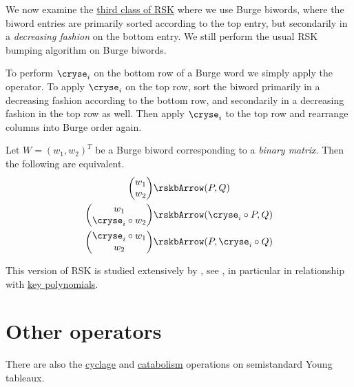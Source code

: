 \bigskip

We now examine the \hyperref[rskBurge]{third class of RSK} where we use Burge biwords,
where the biword entries are primarily sorted according to the top entry,
but secondarily in a \emph{decreasing fashion} on the bottom entry.
We still perform the usual RSK bumping algorithm on Burge biwords.

To perform $\cryse_i$ on the bottom row of a Burge word we simply apply the operator.
To apply $\cryse_i$ on the top row, sort the biword primarily in a decreasing fashion
according to the bottom row, and secondarily in a decreasing fashion in the top row as well.
Then apply $\cryse_i$ to the top row and rearrange columns into Burge order again.

Let $W = (w_1,w_2)^T$ be a Burge biword corresponding to a \emph{binary matrix}.
Then the following are equivalent.
\begin{align}
\begin{pmatrix} w_1 \\ w_2 \end{pmatrix} & \rskbArrow (P,Q)  \\
\begin{pmatrix}  w_1 \\ \cryse_i \circ w_2 \end{pmatrix} & \rskbArrow (\cryse_i \circ P, Q) \\
\begin{pmatrix} \cryse_i \circ w_1 \\ w_2 \end{pmatrix} & \rskbArrow (P, \cryse_i \circ Q) \\
\end{align}


This version of RSK is studied extensively by , see \cite{Azenhas2006},
in particular in relationship with \hyperref[key]{key polynomials}.


\section[tableauOpOther]{Other operators}

There are also the \hyperref[cyclage]{cyclage} and
\hyperref[catabolism]{catabolism} operations on semistandard Young tableaux.
